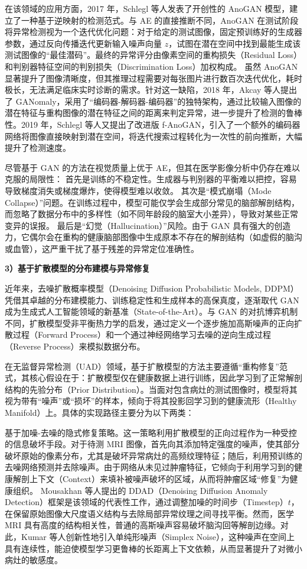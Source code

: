 \documentclass[Win]{xjtuBSThesis}  %
\begin{document}
在该领域的应用方面，2017 年，Schlegl 等人发表了开创性的 AnoGAN 模型，建立了一种基于逆映射的检测范式。与 AE 的直接推断不同，AnoGAN 在测试阶段将异常检测视为一个迭代优化问题：对于给定的测试图像，固定预训练好的生成器参数，通过反向传播迭代更新输入噪声向量 $z$，试图在潜在空间中找到最能生成该测试图像的“最佳潜码”。最终的异常评分由像素空间的重构损失（Residual Loss）和判别器特征空间的判别损失（Discrimination Loss）加权构成。
虽然 AnoGAN 显著提升了图像清晰度，但其推理过程需要对每张图片进行数百次迭代优化，耗时极长，无法满足临床实时诊断的需求。针对这一缺陷，2018 年，Akcay 等人提出了 GANomaly，采用了“编码器-解码器-编码器”的独特架构，通过比较输入图像的潜在特征与重构图像的潜在特征之间的距离来判定异常，进一步提升了检测的鲁棒性。2019 年，Schlegl 等人又提出了改进版 f-AnoGAN，引入了一个额外的编码器网络将图像直接映射到潜在空间，将迭代搜索过程转化为一次性的前向推断，大幅提升了检测速度。

尽管基于 GAN 的方法在视觉质量上优于 AE，但其在医学影像分析中仍存在难以克服的局限性：
首先是训练的不稳定性。生成器与判别器的平衡难以把控，容易导致梯度消失或梯度爆炸，使得模型难以收敛。
其次是“模式崩塌（Mode Collapse）”问题。在训练过程中，模型可能仅学会生成部分常见的脑部解剖结构，而忽略了数据分布中的多样性（如不同年龄段的脑室大小差异），导致对某些正常变异的误报。
最后是“幻觉（Hallucination）”风险。由于 GAN 具有强大的创造力，它偶尔会在重构的健康脑部图像中生成原本不存在的解剖结构（如虚假的脑沟或血管），这严重干扰了基于残差的异常定位准确性。


\textbf{3）基于扩散模型的分布建模与异常修复}

近年来，去噪扩散概率模型（Denoising Diffusion Probabilistic Models, DDPM）凭借其卓越的分布建模能力、训练稳定性和生成样本的高保真度，逐渐取代 GAN 成为生成式人工智能领域的新基准（State-of-the-Art）。与 GAN 的对抗博弈机制不同，扩散模型受非平衡热力学的启发，通过定义一个逐步施加高斯噪声的正向扩散过程（Forward Process）和一个通过神经网络学习去噪的逆向生成过程（Reverse Process）来模拟数据分布。

在无监督异常检测（UAD）领域，基于扩散模型的方法主要遵循“重构修复”范式，其核心假设在于：扩散模型仅在健康数据上进行训练，因此学习到了正常解剖结构的先验分布（Prior Distribution）。当面对包含病灶的测试图像时，模型将其视为带有“噪声”或“损坏”的样本，倾向于将其投影回学习到的健康流形（Healthy Manifold）上。具体的实现路径主要分为以下两类：

基于加噪-去噪的隐式修复策略。这一策略利用扩散模型的正向过程作为一种受控的信息破坏手段。对于待测 MRI 图像，首先向其添加特定强度的噪声，使其部分破坏原始的像素分布，尤其是破坏异常病灶的高频纹理特征；随后，利用预训练的去噪网络预测并去除噪声。由于网络从未见过肿瘤特征，它倾向于利用学习到的健康解剖上下文（Context）来填补被噪声破坏的区域，从而将肿瘤区域“修复”为健康组织。
Mousakhan 等人提出的 DDAD（Denoising Diffusion Anomaly Detection）框架是该领域的代表性工作，通过调整加噪的时间步（Timestep）$t$，在保留原始图像大尺度语义结构与去除局部异常纹理之间寻找平衡。然而，医学 MRI 具有高度的结构相关性，普通的高斯噪声容易破坏脑沟回等解剖边缘。对此，Kumar 等人创新性地引入单纯形噪声（Simplex Noise），这种噪声在空间上具有连续性，能迫使模型学习更鲁棒的长距离上下文依赖，从而显著提升了对微小病灶的敏感度。
\end{document}
